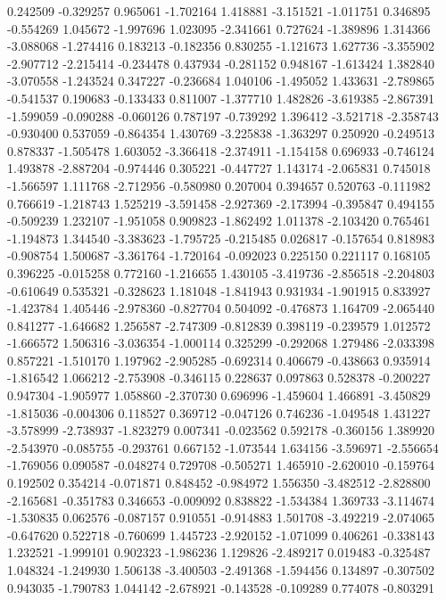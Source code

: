 0.242509
-0.329257
0.965061
-1.702164
1.418881
-3.151521
-1.011751
0.346895
-0.554269
1.045672
-1.997696
1.023095
-2.341661
0.727624
-1.389896
1.314366
-3.088068
-1.274416
0.183213
-0.182356
0.830255
-1.121673
1.627736
-3.355902
-2.907712
-2.215414
-0.234478
0.437934
-0.281152
0.948167
-1.613424
1.382840
-3.070558
-1.243524
0.347227
-0.236684
1.040106
-1.495052
1.433631
-2.789865
-0.541537
0.190683
-0.133433
0.811007
-1.377710
1.482826
-3.619385
-2.867391
-1.599059
-0.090288
-0.060126
0.787197
-0.739292
1.396412
-3.521718
-2.358743
-0.930400
0.537059
-0.864354
1.430769
-3.225838
-1.363297
0.250920
-0.249513
0.878337
-1.505478
1.603052
-3.366418
-2.374911
-1.154158
0.696933
-0.746124
1.493878
-2.887204
-0.974446
0.305221
-0.447727
1.143174
-2.065831
0.745018
-1.566597
1.111768
-2.712956
-0.580980
0.207004
0.394657
0.520763
-0.111982
0.766619
-1.218743
1.525219
-3.591458
-2.927369
-2.173994
-0.395847
0.494155
-0.509239
1.232107
-1.951058
0.909823
-1.862492
1.011378
-2.103420
0.765461
-1.194873
1.344540
-3.383623
-1.795725
-0.215485
0.026817
-0.157654
0.818983
-0.908754
1.500687
-3.361764
-1.720164
-0.092023
0.225150
0.221117
0.168105
0.396225
-0.015258
0.772160
-1.216655
1.430105
-3.419736
-2.856518
-2.204803
-0.610649
0.535321
-0.328623
1.181048
-1.841943
0.931934
-1.901915
0.833927
-1.423784
1.405446
-2.978360
-0.827704
0.504092
-0.476873
1.164709
-2.065440
0.841277
-1.646682
1.256587
-2.747309
-0.812839
0.398119
-0.239579
1.012572
-1.666572
1.506316
-3.036354
-1.000114
0.325299
-0.292068
1.279486
-2.033398
0.857221
-1.510170
1.197962
-2.905285
-0.692314
0.406679
-0.438663
0.935914
-1.816542
1.066212
-2.753908
-0.346115
0.228637
0.097863
0.528378
-0.200227
0.947304
-1.905977
1.058860
-2.370730
0.696996
-1.459604
1.466891
-3.450829
-1.815036
-0.004306
0.118527
0.369712
-0.047126
0.746236
-1.049548
1.431227
-3.578999
-2.738937
-1.823279
0.007341
-0.023562
0.592178
-0.360156
1.389920
-2.543970
-0.085755
-0.293761
0.667152
-1.073544
1.634156
-3.596971
-2.556654
-1.769056
0.090587
-0.048274
0.729708
-0.505271
1.465910
-2.620010
-0.159764
0.192502
0.354214
-0.071871
0.848452
-0.984972
1.556350
-3.482512
-2.828800
-2.165681
-0.351783
0.346653
-0.009092
0.838822
-1.534384
1.369733
-3.114674
-1.530835
0.062576
-0.087157
0.910551
-0.914883
1.501708
-3.492219
-2.074065
-0.647620
0.522718
-0.760699
1.445723
-2.920152
-1.071099
0.406261
-0.338143
1.232521
-1.999101
0.902323
-1.986236
1.129826
-2.489217
0.019483
-0.325487
1.048324
-1.249930
1.506138
-3.400503
-2.491368
-1.594456
0.134897
-0.307502
0.943035
-1.790783
1.044142
-2.678921
-0.143528
-0.109289
0.774078
-0.803291
